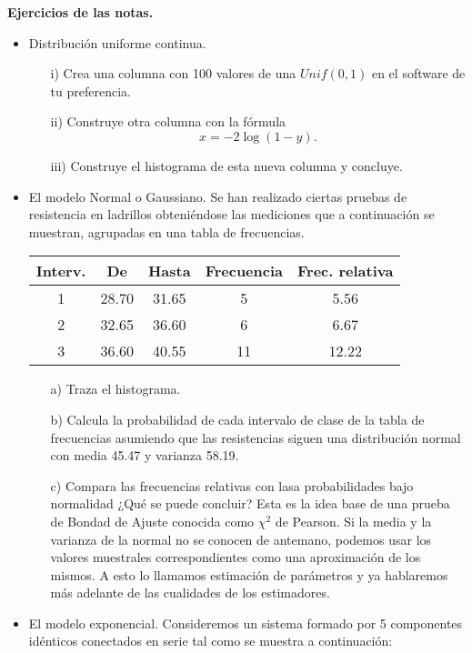 \documentclass[11pt,letterpaper]{article}
\begin{document}
\textbf{Ejercicios de las notas. }
\begin{itemize}

\item Distribución uniforme continua.
\begin{itemize}
\item[i)] Crea una columna con 100 valores de una $Unif(0,1)$ en el software de tu preferencia.
\item[ii)] Construye otra columna con la fórmula $$x=-2\log(1-y).$$
\item[iii)] Construye el histograma de esta nueva columna y concluye.
\end{itemize} 

\item El modelo Normal o Gaussiano. Se han realizado ciertas pruebas de resistencia en ladrillos obteniéndose las mediciones que a continuación se muestran, agrupadas en una tabla de frecuencias.
\begin{table}[H]
\centering
\begin{tabular}{ccccc}
\hline
Interv. & De & Hasta & Frecuencia & Frec. relativa\\ \hline
1 & 28.70 & 31.65 & 5 & 5.56\\
2 & 32.65 & 36.60 & 6 & 6.67\\
3 & 36.60 & 40.55 &11 & 12.22\\
\hline
\end{tabular}
\end{table}
\begin{itemize}
\item[a)] Traza el histograma.
\item[b)] Calcula la probabilidad de cada intervalo de clase de la tabla de frecuencias asumiendo que las resistencias siguen una distribución normal con media 45.47 y varianza 58.19.
\item[c)] Compara las frecuencias relativas con lasa probabilidades bajo normalidad ¿Qué se puede concluir? Esta es la idea base de una prueba de Bondad de Ajuste conocida como $\chi^2$ de Pearson. Si la media y la varianza de la normal no se conocen de antemano, podemos usar los valores muestrales correspondientes como una aproximación de los mismos. A esto lo llamamos estimación de parámetros y ya hablaremos más adelante de las cualidades de los estimadores.
\end{itemize}

\item El modelo exponencial. Consideremos un sistema formado por 5 componentes idénticos conectados en serie tal como se muestra a continuación:


\end{itemize}
\end{document}
